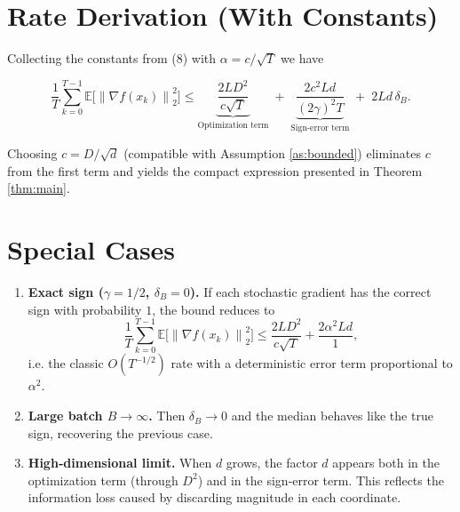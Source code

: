 \documentclass{article}
\newcommand{\EE}{\mathbb{E}}
\newcommand{\norm}[1]{\left\|#1\right\|}
\newcommand{\grad}{\nabla}
\begin{document}
\section*{Rate Derivation (With Constants)}

Collecting the constants from (8) with $\alpha=c/\sqrt{T}$ we have

\[
\frac{1}{T}\sum_{k=0}^{T-1}\EE\!\big[\norm{\grad f(x_{k})}_{2}^{2}\big]
\le
\underbrace{\frac{2L D^{2}}{c\sqrt{T}}}_{\text{Optimization term}}
\;+\;
\underbrace{\frac{2c^{2}L d}{(2\gamma)^{2}T}}_{\text{Sign‑error term}}
\;+\;
2L d\,\delta_{B}.
\]

Choosing $c=D/\sqrt{d}$ (compatible with Assumption \ref{as:bounded}) eliminates $c$ from the first term and yields the compact expression presented in Theorem \ref{thm:main}.

\section*{Special Cases}

\begin{enumerate}[label={\arabic*.}]
\item \textbf{Exact sign ($\gamma=1/2$, $\delta_{B}=0$).}  
If each stochastic gradient has the correct sign with probability $1$, the bound reduces to
\[
\frac{1}{T}\sum_{k=0}^{T-1}\EE\!\big[\norm{\grad f(x_{k})}_{2}^{2}\big]
\le \frac{2L D^{2}}{c\sqrt{T}}+\frac{2\alpha^{2}L d}{1},
\]
i.e. the classic $O(T^{-1/2})$ rate with a deterministic error term proportional to $\alpha^{2}$.

\item \textbf{Large batch $B\rightarrow\infty$.}  
Then $\delta_{B}\to0$ and the median behaves like the true sign, recovering the previous case.

\item \textbf{High‑dimensional limit.}  
When $d$ grows, the factor $d$ appears both in the optimization term (through $D^{2}$) and in the sign‑error term.  This reflects the information loss caused by discarding magnitude in each coordinate.

\end{enumerate}
\end{document}
